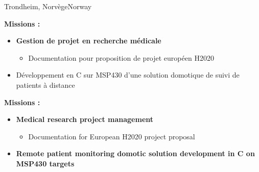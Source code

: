 {}{}{Trondheim, \ifnativelang Norv\`ege\else Norway\fi}{
\ifnativelang
	\textcolor{color1}{\textbf{Missions :}}
	\begin{itemize}[leftmargin=\ListItemsMargins]
		\ifaddmngt
		\item \textbf{Gestion de projet en recherche m\'edicale}
		\begin{itemize}
			\item Documentation pour proposition de projet europ\'een H2020
		\end{itemize}
		\fi
		\item Développement en C  sur MSP430 d’une solution domotique de suivi de patients à distance
	\end{itemize}
\else
	\textcolor{color1}{\textbf{Missions :}}
	\begin{itemize}[leftmargin=\ListItemsMargins]
		\ifaddmngt
		\item \textbf{Medical research project management}
		\begin{itemize}
			\item Documentation for European H2020 project proposal
		\end{itemize}
		\fi
		\item \textbf{Remote patient monitoring domotic solution development in C on MSP430 targets}
	\end{itemize}
\fi
}


\vspace{\ItemsMaxSpacing}

